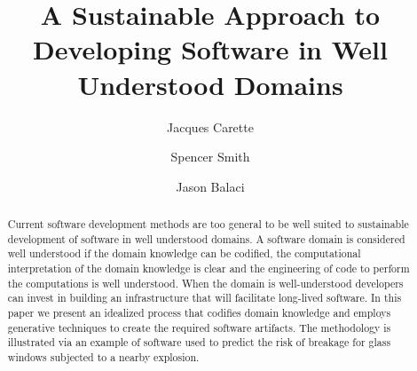 \documentclass[sigconf,review]{acmart}
\begin{document}
\title{A Sustainable Approach to Developing Software in Well Understood Domains}

\author{Jacques Carette}

\author{Spencer Smith}

\author{Jason Balaci}

\begin{abstract}
  Current software development methods are too general to be well suited to
  sustainable development of software in well understood domains.  A software
  domain is considered well understood if the domain knowledge can be codified,
  the computational interpretation of the domain knowledge is clear and the
  engineering of code to perform the computations is well understood.  When the
  domain is well-understood developers can invest in building an infrastructure
  that will facilitate long-lived software.  In this paper we present an
  idealized process that codifies domain knowledge and employs generative
  techniques to create the required software artifacts.  The methodology is
  illustrated via an example of software used to predict the risk of breakage
  for glass windows subjected to a nearby explosion.
\end{abstract}
\end{document}

